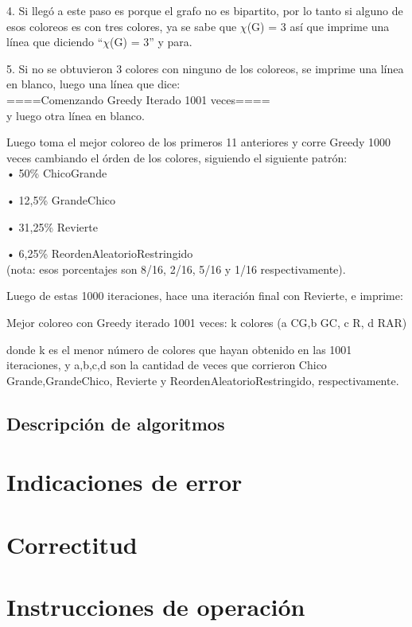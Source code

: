 \documentclass[11pt,a4paper]{article}
\theoremstyle{plain}
\begin{document}
4. Si llegó a este paso es porque el grafo no es bipartito, por lo tanto si alguno de esos coloreos es con tres colores, ya se sabe que $\chi$(G) = 3 así que imprime una línea que diciendo “$\chi$(G) = 3” y para.

5. Si no se obtuvieron 3 colores con ninguno de los coloreos, se imprime una línea en blanco, luego una línea que dice:\\

====Comenzando Greedy Iterado 1001 veces====\\

y luego otra línea en blanco.

Luego toma el mejor coloreo de los primeros 11 anteriores y corre Greedy 1000 veces cambiando el órden de los colores, siguiendo el siguiente patrón:\\

• 50\% ChicoGrande

• 12,5\% GrandeChico

• 31,25\% Revierte

• 6,25\% ReordenAleatorioRestringido\\

(nota: esos porcentajes son 8/16, 2/16, 5/16 y 1/16 respectivamente).

Luego de estas 1000 iteraciones, hace una iteración final con Revierte, e imprime:

Mejor coloreo con Greedy iterado 1001 veces: k colores
(a CG,b GC, c R, d RAR)

donde k es el menor número de colores que hayan obtenido en las 1001 iteraciones, y a,b,c,d son la cantidad de veces que corrieron Chico Grande,GrandeChico, Revierte y ReordenAleatorioRestringido,
respectivamente.

		\subsection{Descripción de algoritmos}

\section{Indicaciones de error}

\section{Correctitud}

\section{Instrucciones de operación}
\end{document}
